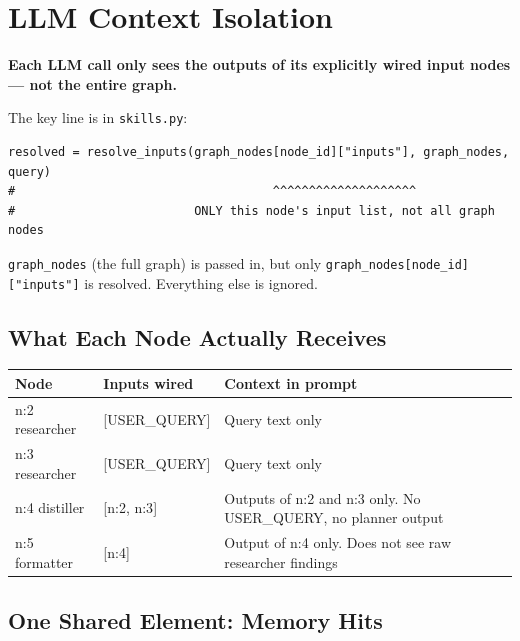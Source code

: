 \documentclass[12pt,a4paper]{article}
\begin{document}
\section{LLM Context Isolation}

\begin{notebox}
\textbf{Each LLM call only sees the outputs of its explicitly wired input
nodes — not the entire graph.}
\end{notebox}

The key line is in \texttt{skills.py}:

\begin{lstlisting}[style=pycode, caption={Context is scoped to node inputs only — skills.py:266}]
resolved = resolve_inputs(graph_nodes[node_id]["inputs"], graph_nodes, query)
#                                    ^^^^^^^^^^^^^^^^^^^^
#                         ONLY this node's input list, not all graph nodes
\end{lstlisting}

\texttt{graph\_nodes} (the full graph) is passed in, but only
\texttt{graph\_nodes[node\_id]["inputs"]} is resolved. Everything else is
ignored.

\subsection{What Each Node Actually Receives}

\begin{center}
\begin{tabular}{>{\ttfamily\small}p{2.8cm} >{\ttfamily\small}p{2.8cm} p{6.5cm}}
\toprule
\normalfont\textbf{Node} & \normalfont\textbf{Inputs wired} & \normalfont\textbf{Context in prompt} \\
\midrule
n:2 researcher & {[}USER\_QUERY{]} & Query text only \\
n:3 researcher & {[}USER\_QUERY{]} & Query text only \\
n:4 distiller  & {[}n:2, n:3{]}   & Outputs of n:2 and n:3 only. No USER\_QUERY, no planner output \\
n:5 formatter  & {[}n:4{]}        & Output of n:4 only. Does not see raw researcher findings \\
\bottomrule
\end{tabular}
\end{center}

\subsection{One Shared Element: Memory Hits}
\end{document}
